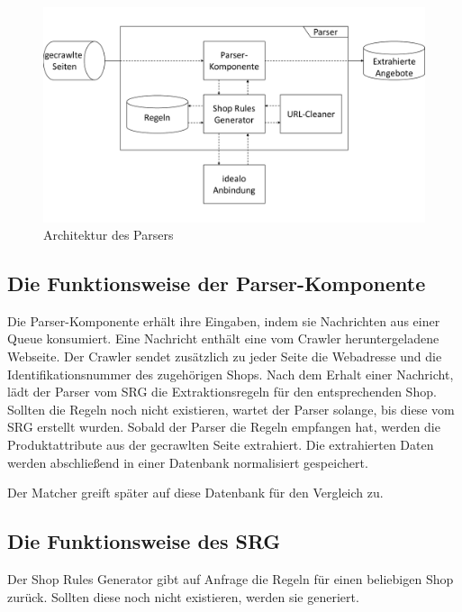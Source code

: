 \begin{figure}[H]
    \centering
    \includegraphics[width=13cm, trim=0 1.7cm 0 1.7cm, clip]{resources/Architektur-Parser.pdf}
    \caption{Architektur des Parsers}
    \label{abb:architektur-parser}
\end{figure}

\subsection{Die Funktionsweise der Parser-Komponente}
\label{subsec:funktionsweise-parser}

Die Parser-Komponente erhält ihre Eingaben, indem sie Nachrichten aus einer Queue konsumiert.
Eine Nachricht enthält eine vom Crawler heruntergeladene Webseite.
Der Crawler sendet zusätzlich zu jeder Seite die Webadresse und die Identifikationsnummer des zugehörigen Shops.
Nach dem Erhalt einer Nachricht, lädt der Parser vom SRG die Extraktionsregeln für den entsprechenden Shop.
Sollten die Regeln noch nicht existieren, wartet der Parser solange, bis diese vom SRG erstellt wurden.
Sobald der Parser die Regeln empfangen hat, werden die Produktattribute aus der gecrawlten Seite extrahiert.
Die extrahierten Daten werden abschließend in einer Datenbank normalisiert gespeichert.

Der Matcher greift später auf diese Datenbank für den Vergleich zu.

\subsection{Die Funktionsweise des SRG}
\label{subsec:funktionsweise-srg}

Der Shop Rules Generator gibt auf Anfrage die Regeln für einen beliebigen Shop zurück.
Sollten diese noch nicht existieren, werden sie generiert.

